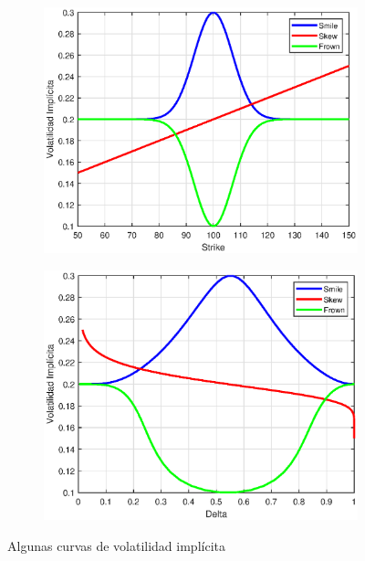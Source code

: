 \begin{figure}[H]
    \centering
    \begin{subfigure}[b]{0.45\linewidth}
        \includegraphics[width=\linewidth]{Imagenes/Parte1/6_Sols/IV_vs_Strike.eps}
    \end{subfigure}
    \begin{subfigure}[b]{0.45\linewidth}
        \includegraphics[width=\linewidth]{Imagenes/Parte1/6_Sols/IV_vs_Delta.eps}
    \end{subfigure}
    \caption{Algunas curvas de volatilidad implícita}
\end{figure}






